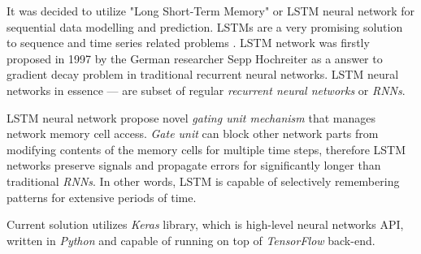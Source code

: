 It was decided  to utilize "Long Short-Term Memory" \cite{hochreiter1997long} or LSTM neural network for sequential data modelling and prediction. LSTMs are a very promising solution to sequence and time series related problems \cite{malhotra2015long}. LSTM network was firstly proposed in 1997 by the German researcher Sepp Hochreiter \cite{hochreiter1997long} as a answer to gradient decay problem in traditional recurrent neural networks. LSTM neural networks in essence --- are subset of regular \textit{recurrent neural networks} or \textit{RNNs}. 

LSTM neural network propose novel \textit{gating unit mechanism} that manages network memory cell access. \textit{Gate unit} can block other network parts from modifying contents of the memory cells for multiple time steps, therefore LSTM networks preserve signals and propagate errors for significantly longer than traditional \textit{RNNs}. In other words, LSTM is capable of selectively remembering patterns for extensive periods of time.

Current solution utilizes \textit{Keras} library, which is high-level neural networks API, written in \textit{Python} and capable of running on top of \textit{TensorFlow} back-end.

